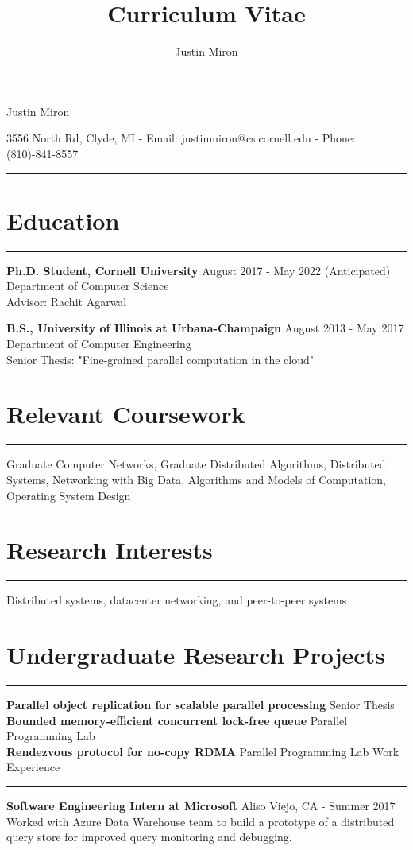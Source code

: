 \documentclass[10pt]{article}
\title{Curriculum Vitae}
\author{Justin Miron}
\makeatletter
\newcommand{\Hrule}{\par\rule{\linewidth}{0.3mm}}
\newcommand{\leftrightrow}[2]{
	#1 \hfill #2 \\
}
\newcommand{\titlesection}{
\parindent=0pt
\setlength{\parskip}{0.1em}
\par{\LARGE Justin Miron}
\par{3556 North Rd, Clyde, MI - Email: justinmiron@cs.cornell.edu - Phone: (810)-841-8557}
\vspace{-0.5em}
\Hrule
}
\newcommand{\workblock}[3]{
	\leftrightrow{\textbf{#1}}{#2}
    #3 \\
}
\newcommand{\researchblock}[3]{
	\textbf{#1} \hfill #2
}
\newcommand{\educationblock}[3]{
	\leftrightrow{\textbf{#1}}{#2}
    #3 \\
}
\makeatother
\begin{document}
\titlesection
\setlength{\parskip}{0em}

\section{Education}
\hrule \vspace{0.4em} 
\educationblock{Ph.D. Student, Cornell University}{August 2017 - May 2022 (Anticipated)}{Department of Computer Science}
Advisor: Rachit Agarwal
\vspace{0.5em}

\educationblock{B.S., University of Illinois at Urbana-Champaign}{August 2013 - May 2017}{Department of Computer Engineering}
Senior Thesis: "Fine-grained parallel computation in the cloud"

\section{Relevant Coursework}
\hrule \vspace{0.4em}
Graduate Computer Networks, Graduate Distributed Algorithms, Distributed Systems, Networking with Big Data, Algorithms and Models of Computation, Operating System Design

\section{Research Interests}
\hrule \vspace{0.4em}
Distributed systems, datacenter networking, and peer-to-peer systems

\section{Undergraduate Research Projects}
\hrule \vspace{0.4em}
\researchblock{Parallel object replication for scalable parallel processing}{Senior Thesis}
\\\\
\researchblock{Bounded memory-efficient concurrent lock-free queue}{Parallel Programming Lab}
\\\\
\researchblock{Rendezvous protocol for no-copy RDMA}{Parallel Programming Lab}

\section{Work Experience}
\hrule \vspace{0.4em}
\workblock{Software Engineering Intern at Microsoft}{Aliso Viejo, CA - Summer 2017}{Worked with Azure Data Warehouse team to build a prototype of a distributed query store for improved query monitoring and debugging.} 
\end{document}
